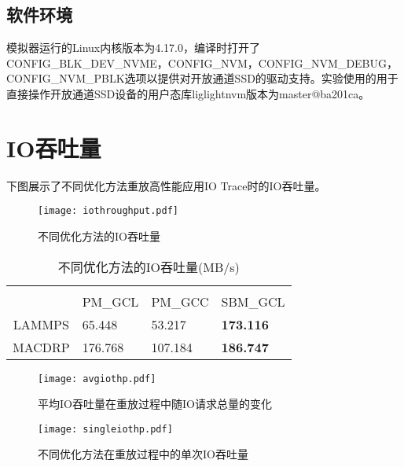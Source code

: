 \subsection{软件环境}
模拟器运行的Linux内核版本为4.17.0，编译时打开了CONFIG\_BLK\_DEV\_NVME，CONFIG\_NVM，CONFIG\_NVM\_DEBUG，CONFIG\_NVM\_PBLK选项以提供对开放通道SSD的驱动支持。实验使用的用于直接操作开放通道SSD设备的用户态库liglightnvm版本为master@ba201ca。

\section{IO吞吐量}
下图展示了不同优化方法重放高性能应用IO Trace时的IO吞吐量。
\begin{figure}[H]
    \centering
    \texttt{[image: iothroughput.pdf]}
    \caption{不同优化方法的IO吞吐量}
    \label{fig:res_iototal}
\end{figure}

\begin{table}[htbb]
    \centering
    \begin{minipage}[t]{0.8\linewidth}
    \caption[不同优化方法的IO吞吐量(MB/s)]{不同优化方法的IO吞吐量(MB/s)}
    \label{tab:res_iototal}
    \begin{tabularx}{\linewidth}{cYYY}
        \toprule[1.5pt]
         &   \\ \cmidrule(l){2-4} 
                     & PM\_GCL & PM\_GCC & SBM\_GCL \\ \midrule[1pt]
                     LAMMPS &65.448&53.217    & \textbf{173.116}    \\
                     MACDRP    & 176.768 &107.184    & \textbf{186.747}    \\ \bottomrule[1.5pt]
        \end{tabularx}
    \end{minipage}
\end{table}

\begin{figure}[H]
    \centering
    \texttt{[image: avgiothp.pdf]}
    \caption{平均IO吞吐量在重放过程中随IO请求总量的变化}
    \label{fig:res_ioavg}
\end{figure}

\begin{figure}[H]
    \centering
    \texttt{[image: singleiothp.pdf]}
    \caption{不同优化方法在重放过程中的单次IO吞吐量}
    \label{fig:res_isingle}
\end{figure}


